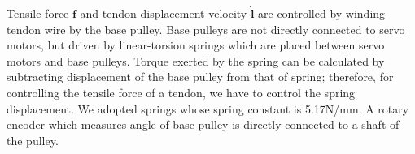 \documentclass{llncs}
\begin{document}
Tensile force $\bm{f}$ and tendon displacement velocity $\dot{\bm{l}}$ are controlled by winding tendon wire by the base pulley.
Base pulleys are not directly connected to servo motors, but driven by linear-torsion springs which are placed between servo motors and base pulleys.
Torque exerted by the spring can be calculated by subtracting displacement of the base pulley from that of spring;
therefore, for controlling the tensile force of a tendon, we have to control the spring displacement.
We adopted springs whose spring constant is 5.17N/mm.
A rotary encoder which measures angle of base pulley is directly connected to a shaft of the pulley.

\end{document}
